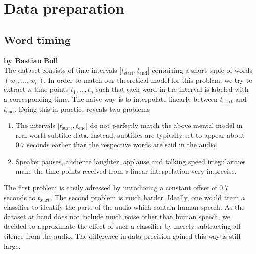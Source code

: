 \chapter{Data preparation}

\section{Word timing}

\textbf{by Bastian Boll} \\

The dataset consists of time intervals \(\lbrack t_\text{start}, t_\text{end}\rbrack\) containing a short tuple of words \((w_1,\dotsc,w_n)\). In order to match our theoretical model for this problem, we try to extract $n$ time points \(t_1,\dotsc,t_n\) such that each word in the interval is labeled with a corresponding time. The naive way is to interpolate linearly between \(t_\text{start}\) and \(t_\text{end}\). Doing this in practice reveals two problems
\begin{enumerate}
	\item The intervals \(\lbrack t_\text{start}, t_\text{end}\rbrack\) do not perfectly match the above mental model in real world subtitle data. Instead, subtitles are typically set to appear about $0.7$ seconds earlier than the respective words are said in the audio.
	\item Speaker pauses, audience laughter, applause and talking speed irregularities make the time points received from a linear interpolation very imprecise.
\end{enumerate}
The first problem is easily adressed by introducing a constant offset of $0.7$ seconds to $t_\text{start}$. The second problem is much harder. Ideally, one would train a classifier to identify the parts of the audio which contain human speech. As the dataset at hand does not include much noise other than human speech, we decided to approximate the effect of such a classifier by merely subtracting all silence from the audio. The difference in data precision gained this way is still large.

